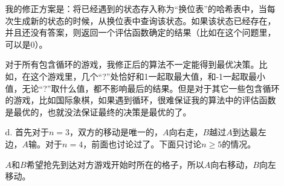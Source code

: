 \documentclass[UTF8,zihao=-4]{ctexart}
\begin{document}
\begin{itemize}
\begin{enumerate}
            我的修正方案是：将已经遇到的状态存入称为“换位表”的哈希表中，当每次生成新的状态的时候，从换位表中查询该状态。如果该状态已经存在，并且还没有答案，则返回一个评估函数确定的结果（比如在这个问题里，可以是0）。

            对于所有包含循环的游戏，我修正后的算法不一定能得到最优决策。比如，在这个游戏里，几个``?''处恰好和1一起取最大值，和-1一起取最小值，无论``?''取什么值，都不影响最后的结果。但是对于其它一些包含循环的游戏，比如国际象棋，如果遇到循环，很难保证我的算法中的评估函数是最优的，也就没法保证最终的决策是最优的了。
            \item[d.] 首先对于$n=3$，双方的移动是唯一的，$A$向右走，$B$越过$A$到达最左边，$A$输。对于$n=4$，前面也讨论过了。下面只讨论$n\geq 5$的情况。

            $A$和$B$希望抢先到达对方游戏开始时所在的格子，所以$A$向右移动，$B$向左移动。


\end{enumerate}
\end{itemize}
\end{document}
